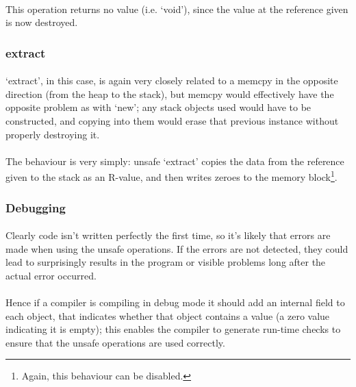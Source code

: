 \documentclass[12pt,twoside,notitlepage]{report}
\begin{document}
\paragraph{}
This operation returns no value (i.e. `void'), since the value at the reference given is now destroyed.

\subsubsection{extract}

\paragraph{}
`extract', in this case, is again very closely related to a memcpy in the opposite direction (from the heap to the stack), but memcpy would effectively have the opposite problem as with `new'; any stack objects used would have to be constructed, and copying into them would erase that previous instance without properly destroying it.

\paragraph{}
The behaviour is very simply: unsafe `extract' copies the data from the reference given to the stack as an R-value, and then writes zeroes to the memory block\footnote{Again, this behaviour can be disabled.}.

\subsubsection{Debugging}

\paragraph{}
Clearly code isn't written perfectly the first time, so it's likely that errors are made when using the unsafe operations. If the errors are not detected, they could lead to surprisingly results in the program or visible problems long after the actual error occurred.

\paragraph{}
Hence if a compiler is compiling in debug mode it should add an internal field to each object, that indicates whether that object contains a value (a zero value indicating it is empty); this enables the compiler to generate run-time checks to ensure that the unsafe operations are used correctly.
\end{document}
